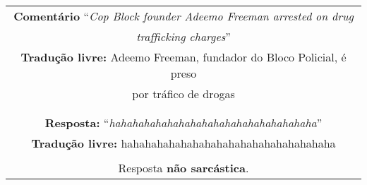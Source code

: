 \begin{center}
\begin{tabular}{|c|}

\hline

\textbf{Comentário} ``\textit{Cop Block founder Adeemo Freeman arrested on drug} \\
\textit{trafficking charges}'' \\

\textbf{Tradução livre:} Adeemo Freeman, fundador do Bloco Policial, é preso \\
por tráfico de drogas \\ \\

\hline

\\

\textbf{Resposta:} ``\textit{hahahahahahahahahahahahahahahahahaha}'' \\

\textbf{Tradução livre:} hahahahahahahahahahahahahahahahahaha \\ \\

Resposta \textbf{não sarcástica}.

\\ \hline

\end{tabular}
\end{center}

